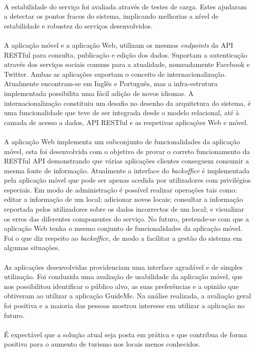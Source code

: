 \\
A estabilidade do serviço foi avaliada através de testes de carga. Estes ajudaram a detectar os pontos fracos do sistema, implicando melhorias a nível de estabilidade e robustez do serviços desenvolvidos.\\
\\
A aplicação móvel e a aplicação Web, utilizam os mesmos \textit{endpoints} da API RESTful para consulta, publicação e edição dos dados. Suportam a autenticação através dos serviços sociais comuns para a atualidade, nomeadamente Facebook e Twitter. Ambas as aplicações suportam o conceito de internacionalização. Atualmente encontram-se em Inglês e Português, mas a infra-estrutura implementada possibilita uma fácil adição de novos idiomas. A internacionalização constituiu um desafio no desenho da arquitetura do sistema, é uma funcionalidade que teve de ser integrada desde o modelo relacional, até à camada de acesso a dados, API RESTful e as respetivas aplicações Web e móvel.\\
\\
A aplicação Web implementa um subconjunto de funcionalidades da aplicação móvel, esta foi desenvolvida com o objetivo de provar o correto funcionamento da RESTful API demonstrando que várias aplicações clientes conseguem consumir a mesma fonte de informação. Atualmente a interface do \textit{backoffice} é implementada pela aplicação móvel que pode ser apenas acedida por utilizadores com privilégios especiais. Em modo de administração é possível realizar operações tais como: editar a informação de um local; adicionar novos locais; consultar a informação reportada pelos utilizadores sobre os dados incorrectos de um local; e visualizar os erros das diferentes componentes do serviço. No futuro, pretende-se com que a aplicação Web tenha o mesmo conjunto de funcionalidades da aplicação móvel. Foi o que diz respeito ao \textit{backoffice}, de modo a facilitar a gestão do sistema em algumas situações.\\
\\
As aplicações desenvolvidas providenciam uma interface agradável e de simples utilização. Foi conduzida uma avaliação de usabilidade da aplicação móvel, que nos possibilitou identificar o público alvo, as suas preferências e a opinião que obtiveram ao utilizar a aplicação GuideMe. Na análise realizada, a avaliação geral foi positiva e a maioria das pessoas mostrou interesse em utilizar a aplicação no futuro.\\
\\
É expectável que a solução atual seja posta em prática e que contribua de forma positiva para o aumento de turismo nos locais menos conhecidos.

